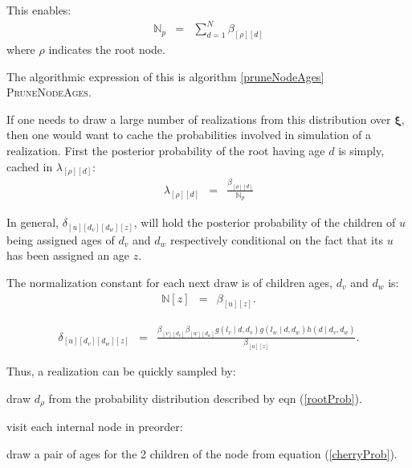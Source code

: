 \documentclass{llncs}
\newcommand{\edgeLen}[1]{\ensuremath{l_{#1}}\xspace}
\newcommand{\timeBinRealizationVec}[0]{\ensuremath{\bm{\xi}}\xspace}
\newcommand{\subtreeAgeSum}[2]{\ensuremath{\beta_{[{#1}][{#2}]}}\xspace}
\newcommand{\ratePriorDensity}[0]{\ensuremath{g}\xspace}
\newcommand{\timePriorDensity}[0]{\ensuremath{h}\xspace}
\newcommand{\norm}[0]{\ensuremath{\mathbb{N}}\xspace}
\newcommand{\rootNode}[0]{\rho}
\newcommand{\rootPostProbCache}[2]{\ensuremath{\lambda_{[{#1}][{#2}]}}\xspace}
\newcommand{\postProbCache}[4]{\ensuremath{\delta_{[{#1}][{#2}][{#3}][{#4}]}}\xspace}
\begin{document}
This enables:
\begin{eqnarray}
    \norm_p & = & \sum_{d = 1}^{N} \subtreeAgeSum{\rootNode}{d}
\end{eqnarray}
where $\rootNode$ indicates the root node.

The algorithmic expression of this is algorithm \ref{pruneNodeAges} \textsc{PruneNodeAges}.

If one needs to draw a large number of realizations from this distribution over $\timeBinRealizationVec$,
    then one would want to cache the probabilities involved in simulation of 
    a realization.
First the posterior probability of the root having age $d$ is simply, cached in $\rootPostProbCache{\rootNode}{d}$:
\begin{eqnarray}
    \rootPostProbCache{\rootNode}{d} & = & \frac{\subtreeAgeSum{\rootNode}{d}}{\norm_p} \label{rootProb}
\end{eqnarray}

In general,  $\postProbCache{u}{d_v}{d_w}{z}$, will hold the posterior probability of
    the children of $u$ being assigned ages of $d_v$ and $d_w$ respectively
    conditional on the fact that its $u$ has been assigned an age $z$.

The normalization constant for each next draw is of children ages, $d_v$ and $d_w$ is:
\begin{eqnarray}
    \norm[z] & = & \subtreeAgeSum{u}{z}.
\end{eqnarray}

\begin{eqnarray}
    \postProbCache{u}{d_v}{d_w}{z} & = & \frac{
    \subtreeAgeSum{v}{d_v} \subtreeAgeSum{w}{d_w}
    \ratePriorDensity(\edgeLen{v} \mid d, d_v)\ratePriorDensity(\edgeLen{w} \mid d, d_w)
    \timePriorDensity(d \mid d_v, d_w)}{\subtreeAgeSum{u}{z}}.\label{cherryProb}
\end{eqnarray}

Thus, a realization can be quickly sampled by:
\begin{compactenum}
    \item draw $d_{\rootNode}$ from the probability distribution described by eqn (\ref{rootProb}).
    \item visit each internal node in preorder:
    \begin{compactenum}
        \item draw a pair of ages for the 2 children of the node from equation (\ref{cherryProb}).
    \end{compactenum}
\end{compactenum}
\end{document}

